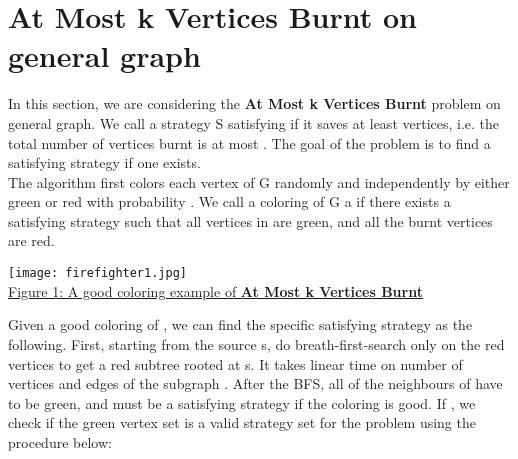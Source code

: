 \documentclass[11pt,letter]{article}
\begin{document}
\section{At Most k Vertices Burnt on general graph}
In this section, we are considering the \textbf{At Most k Vertices Burnt} problem on general graph. We call a strategy S satisfying if it saves at least  vertices, i.e. the total number of vertices burnt is at most . The goal of the problem is to find a satisfying strategy if one exists.\\

The algorithm first colors each vertex of G randomly and independently by either green or red with probability . We call a coloring of G a  if there exists a satisfying strategy  such that all vertices in  are green, and all the burnt vertices are red.\\

\begin{center}
\texttt{[image: firefighter1.jpg]}\\
\underline{Figure 1: A good coloring example of \textbf{At Most k Vertices Burnt}}
\end{center}

Given a good coloring of , we can find the specific satisfying strategy  as the following. First, starting from the source s, do breath-first-search only on the red vertices to get a red subtree  rooted at s. It takes linear time on number of vertices and edges of the subgraph . After the BFS, all of the neighbours of  have to be green, and  must be a satisfying strategy if the coloring is good. If , we check if the green vertex set  is a valid strategy set for the problem using the procedure below:

\begin{center}
\end{center}
\end{document}
